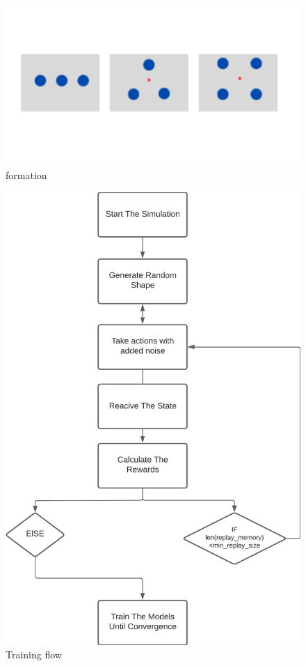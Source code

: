 \documentclass[12pt]{extarticle}
\begin{document}
 
 \begin{figure}[H]  
\centering
\includegraphics[scale=0.4]{formation}
\caption[formation]{formation}
\end{figure}
\pagebreak
\begin{figure}[H]  
\centering
\includegraphics[scale=0.8]{training_workflow3}
\caption[Training flow]{Training flow}
\label{fig:training}
\end{figure}
\end{document}
